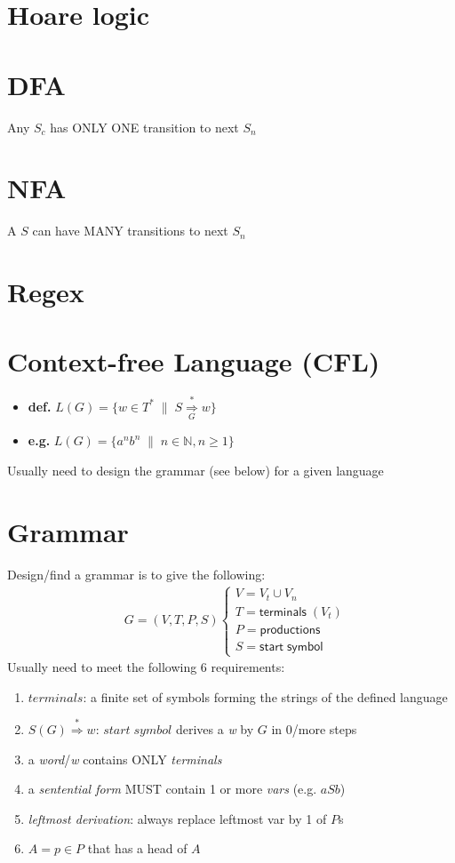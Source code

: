 \documentclass[10pt,a4paper,fleqn,landscape]{article}
\begin{document}
\pagestyle{empty}

\begin{multicols*}{3}
\section*{Hoare logic}
% 
\section*{DFA}
Any \(S_{c}\) has ONLY ONE transition to next \(S_{n}\)
\section*{NFA}
A \(S\) can have MANY transitions to next \(S_{n}\)
\section*{Regex}
\section*{Context-free Language (CFL)}
\newcommand{\derive}[2]{\overset{#1}{\underset{#2}{\Rightarrow}}}
\newcommand{\gor}{\;|\;}
\begin{itemize}
\item \textbf{def.
  } \(L(G) = \{w \in T^{*} \;\|\; S \derive{*}{G} w\}\)
\item \textbf{e.g.} \(L(G) = \{a^{n}b^{n} \;\|\; n \in \mathbb{N}, n \geq 1\}\)
\end{itemize}
Usually need to design the grammar (see below) for a given language
\section*{Grammar}
Design/find a grammar is to give the following:
\begin{align*}
  & G = (V,T,P,S)\left\{
    \begin{array}{l}
      V = V_{t} \cup V_{n} \\
      T = \mathsf{terminals}\; (V_{t}) \\
      P = \mathsf{productions} \\
      S = \mathsf{start \; symbol}
    \end{array}
    \right.
\end{align*}
Usually need to meet the following 6 requirements:
\begin{enumerate}
\item \(terminals\): a finite set of symbols forming the strings of the defined language
\item \(S(G) \overset{*}{\Rightarrow} w\): \(start\; symbol\) derives a \emph{w} by \(G\) in 0/more steps
\item a \emph{word}/\emph{w} contains ONLY \emph{terminals}
\item a \emph{sentential form} MUST contain 1 or more \emph{vars} (e.g. \(aSb\))
\item \emph{leftmost derivation}: always replace leftmost var by 1 of \(P\)s
\item \(A = p \in P\) that has a head of \(A\)
\end{enumerate}

\end{multicols*}
\end{document}
